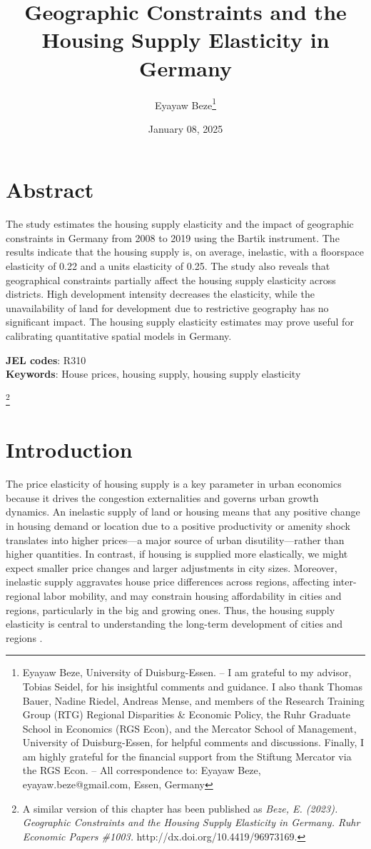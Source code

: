 \documentclass[
  12pt,
]{article}
\title{Geographic Constraints and the Housing Supply Elasticity in
Germany}
\author{Eyayaw Beze\footnote{Eyayaw Beze, University of Duisburg-Essen.
  -- I am grateful to my advisor, Tobias Seidel, for his insightful
  comments and guidance. I also thank Thomas Bauer, Nadine Riedel,
  Andreas Mense, and members of the Research Training Group (RTG)
  Regional Disparities \& Economic Policy, the Ruhr Graduate School in
  Economics (RGS Econ), and the Mercator School of Management,
  University of Duisburg-Essen, for helpful comments and discussions.
  Finally, I am highly grateful for the financial support from the
  Stiftung Mercator via the RGS Econ. -- All correspondence to: Eyayaw
  Beze, eyayaw.beze@gmail.com, Essen, Germany}}
\date{January 08, 2025}
\newcommand\blfootnote[1]{%
  \begingroup
  \renewcommand\thefootnote{}\footnote{#1}%
  \addtocounter{footnote}{-1}%
  \endgroup
}
\begin{document}
\maketitle



\section*{Abstract}\label{abstract}

The study estimates the housing supply elasticity and the impact of
geographic constraints in Germany from 2008 to 2019 using the Bartik
instrument. The results indicate that the housing supply is, on average,
inelastic, with a floorspace elasticity of 0.22 and a units elasticity
of 0.25. The study also reveals that geographical constraints partially
affect the housing supply elasticity across districts. High development
intensity decreases the elasticity, while the unavailability of land for
development due to restrictive geography has no significant impact. The
housing supply elasticity estimates may prove useful for calibrating
quantitative spatial models in Germany.

\textbf{JEL codes}: R310\\
\textbf{Keywords}: House prices, housing supply, housing supply
elasticity

\blfootnote{A similar version of this chapter has been published as \textit{Beze, E. (2023). Geographic Constraints and the Housing Supply Elasticity in Germany. Ruhr Economic Papers \#1003.} http://dx.doi.org/10.4419/96973169.}


\newpage

\section{Introduction}\label{introduction}


The price elasticity of housing supply is a key parameter in urban
economics because it drives the congestion externalities and governs
urban growth dynamics. An inelastic supply of land or housing means that
any positive change in housing demand or location due to a positive
productivity or amenity shock translates into higher prices---a major
source of urban disutility---rather than higher quantities. In contrast,
if housing is supplied more elastically, we might expect smaller price
changes and larger adjustments in city sizes. Moreover, inelastic supply
aggravates house price differences across regions, affecting
inter-regional labor mobility, and may constrain housing affordability
in cities and regions, particularly in the big and growing ones. Thus,
the housing supply elasticity is central to understanding the long-term
development of cities and regions
\citep{combes_etal_2019, glaeser_etal_2006, saks_2008, lerbs_2014}.
\end{document}
